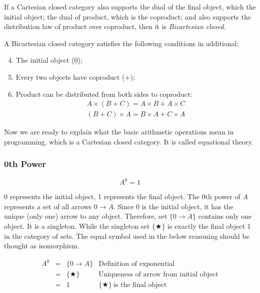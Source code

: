 \documentclass{article}
\begin{document}
If a Cartesian closed category also supports the dual of the final object, which the initial object; the dual of product, which is the coproduct; and also supports the distribution law of product over coproduct, then it is {\em Bicartesian closed}.

A Bicartesian closed category satisfies the following conditions in additional:
\begin{enumerate}
  \setcounter{enumi}{3}
  \item The initial object (0);
  \item Every two objects have coproduct ($+$);
  \item Product can be distributed from both sides to coproduct:
  \[
  \begin{array}{l}
  A \times (B + C) = A \times B + A \times C \\
  (B + C) \times A = B \times A + C \times A
  \end{array}
  \]
\end{enumerate}

 
Now we are ready to explain what the basic arithmetic operations mean in programming, which is a Cartesian closed category. It is called equational theory.

\subsubsection{0th Power}

\[
  A^0 = 1
\]

0 represents the initial object, 1 represents the final object. The 0th power of $A$ represents a set of all arrows $0 \to A$. Since 0 is the initial object, it has the unique (only one) arrow to any object. Therefore, set $\{ 0 \to A \}$ contains only one object. It is a singleton. While the singleton set $\{ \bigstar \}$ is exactly the final object 1 in the category of sets. The equal symbol used in the below reasoning should be thought as isomorphism.

\[
\begin{array}{rcll}
A^0 & = & \{ 0 \to A \} & \text{Definition of exponential} \\
    & = & \{ \bigstar \} & \text{Uniqueness of arrow from initial object} \\
    & = & 1 & \{ \bigstar \}\ \text{is the final object} \\
\end{array}
\]
\end{document}
